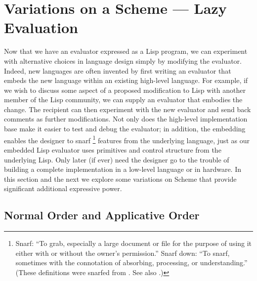 \section{Variations on a Scheme --- Lazy Evaluation}
\label{Section 4.2}

Now that we have an evaluator expressed as a Lisp program, we can experiment with alternative choices in language design simply by modifying the evaluator.
Indeed, new languages are often invented by first writing an evaluator that embeds the new language within an existing high-level language.
For example, if we wish to discuss some aspect of a proposed modification to Lisp with another member of the Lisp community, we can supply an evaluator that embodies the change.
The recipient can then experiment with the new evaluator and send back comments as further modifications.
Not only does the high-level implementation base make it easier to test and debug the evaluator;
in addition, the embedding enables the designer to snarf%
\footnote{
	Snarf:
	“To grab, especially a large document or file for the purpose of using it either with or without the owner’s permission.”
	Snarf down:
	“To snarf, sometimes with the connotation of absorbing, processing, or understanding.”
	(These definitions were snarfed from .
	See also .)
}
features from the underlying language, just as our embedded Lisp evaluator uses primitives and control structure from the underlying Lisp.
Only later (if ever) need the designer go to the trouble of building a complete implementation in a low-level language or in hardware.
In this section and the next we explore some variations on Scheme that provide significant additional expressive power.



\subsection{Normal Order and Applicative Order}
\label{Section 4.2.1}

